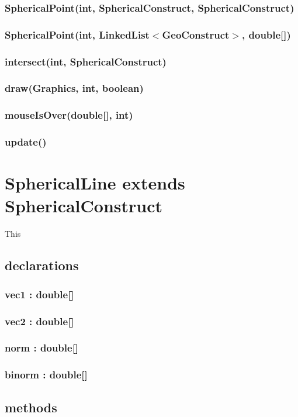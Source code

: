 \documentclass[a4paper,10pt]{report}
\begin{document}
\subsubsection{SphericalPoint(int, SphericalConstruct, SphericalConstruct)}
\subsubsection{SphericalPoint(int, LinkedList$<$GeoConstruct$>$, double[])}
\subsubsection{intersect(int, SphericalConstruct)}
\subsubsection{draw(Graphics, int, boolean)}
\subsubsection{mouseIsOver(double[], int)}
\subsubsection{update()}
\section{SphericalLine extends SphericalConstruct} This
\subsection{declarations}
\subsubsection{vec1 : double[]}
\subsubsection{vec2 : double[]}
\subsubsection{norm : double[]}
\subsubsection{binorm : double[]}
\subsection{methods}
\end{document}
